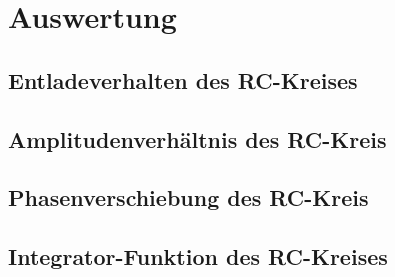 \section{Auswertung}
\label{sec:Auswertung}

\subsection{Entladeverhalten des RC-Kreises}
\label{sec:4a-auswertung}

\subsection{Amplitudenverhältnis des RC-Kreis}
\label{sec:4b-auswertung}

\subsection{Phasenverschiebung des RC-Kreis}
\label{sec:4c-auswertung}

\subsection{Integrator-Funktion des RC-Kreises}
\label{sec:4d-auswertung}

